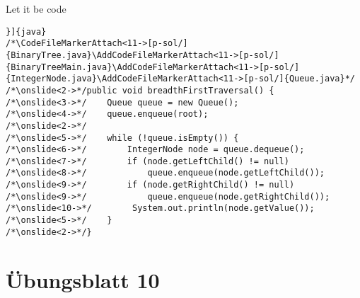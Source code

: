 \begin{frame}[fragile,c]{Let it be code}
\begin{verbatim}}]{java}
/*\CodeFileMarkerAttach<11->[p-sol/]{BinaryTree.java}\AddCodeFileMarkerAttach<11->[p-sol/]{BinaryTreeMain.java}\AddCodeFileMarkerAttach<11->[p-sol/]{IntegerNode.java}\AddCodeFileMarkerAttach<11->[p-sol/]{Queue.java}*/
/*\onslide<2->*/public void breadthFirstTraversal() {
/*\onslide<3->*/    Queue queue = new Queue();
/*\onslide<4->*/    queue.enqueue(root);
/*\onslide<2->*/
/*\onslide<5->*/    while (!queue.isEmpty()) {
/*\onslide<6->*/        IntegerNode node = queue.dequeue();
/*\onslide<7->*/        if (node.getLeftChild() != null)
/*\onslide<8->*/            queue.enqueue(node.getLeftChild());
/*\onslide<9->*/        if (node.getRightChild() != null)
/*\onslide<9->*/            queue.enqueue(node.getRightChild());
/*\onslide<10->*/        System.out.println(node.getValue());
/*\onslide<5->*/    }
/*\onslide<2->*/}
\end{verbatim}
\end{frame}

\section{Übungsblatt 10}
